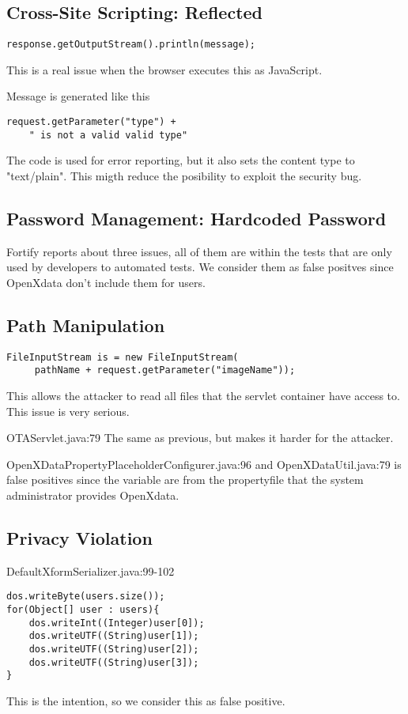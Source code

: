 \documentclass[11pt,a4paper]{article}
\theoremstyle{definition}
\begin{document}
\subsection{Cross-Site Scripting: Reflected}
\begin{lstlisting}[caption=StudyExportServlet.java:106]
response.getOutputStream().println(message);
\end{lstlisting}
This is a real issue when the browser executes this as JavaScript.

Message is generated like this
\begin{lstlisting}
request.getParameter("type") + 
    " is not a valid valid type"
\end{lstlisting}
The code is used for error reporting, but it also sets the content type to "text/plain".
This migth reduce the posibility to exploit the security bug.

\subsection{Password Management: Hardcoded Password}
Fortify reports about three issues, all of them are within the tests that are only used
by developers to automated tests. We consider them as false positves since OpenXdata don't
include them for users.

\subsection{Path Manipulation}
\begin{lstlisting}[caption=BirtImagesServlet.java:61]
FileInputStream is = new FileInputStream(
     pathName + request.getParameter("imageName"));
\end{lstlisting}
This allows the attacker to read all files that the servlet container have access to. This issue is very serious.

OTAServlet.java:79
The same as previous, but makes it harder for the attacker.

OpenXDataPropertyPlaceholderConfigurer.java:96 and OpenXDataUtil.java:79 
is false positives since the variable are from the propertyfile that the system administrator provides OpenXdata.

\subsection{Privacy Violation}
DefaultXformSerializer.java:99-102
\begin{lstlisting}
dos.writeByte(users.size());
for(Object[] user : users){
    dos.writeInt((Integer)user[0]);
    dos.writeUTF((String)user[1]);
    dos.writeUTF((String)user[2]);
    dos.writeUTF((String)user[3]);
}
\end{lstlisting}
This is the intention, so we consider this as false positive.
\end{document}
